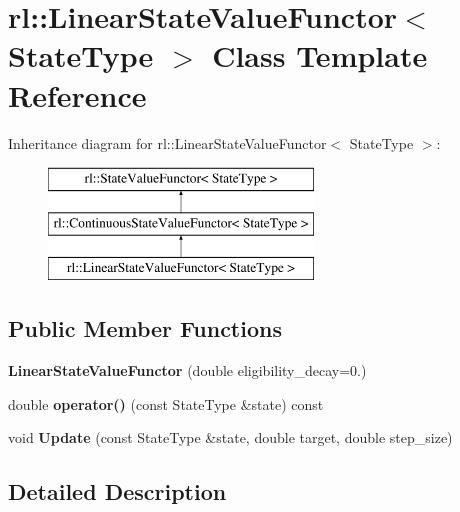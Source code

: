\hypertarget{classrl_1_1_linear_state_value_functor}{}\section{rl\+:\+:Linear\+State\+Value\+Functor$<$ State\+Type $>$ Class Template Reference}
\label{classrl_1_1_linear_state_value_functor}
Inheritance diagram for rl\+:\+:Linear\+State\+Value\+Functor$<$ State\+Type $>$\+:\begin{figure}[H]
\begin{center}
\leavevmode
\includegraphics[height=3.000000cm]{classrl_1_1_linear_state_value_functor}
\end{center}
\end{figure}
\subsection*{Public Member Functions}
\begin{DoxyCompactItemize}
\item 
\hypertarget{classrl_1_1_linear_state_value_functor_a70646abacf43c6d91efa229fa344e43e}{}\label{classrl_1_1_linear_state_value_functor_a70646abacf43c6d91efa229fa344e43e} 
{\bfseries Linear\+State\+Value\+Functor} (double eligibility\+\_\+decay=0.)
\item 
\hypertarget{classrl_1_1_linear_state_value_functor_a4058ae89ce54a0abc8cb9df86322230e}{}\label{classrl_1_1_linear_state_value_functor_a4058ae89ce54a0abc8cb9df86322230e} 
double {\bfseries operator()} (const State\+Type \&state) const
\item 
\hypertarget{classrl_1_1_linear_state_value_functor_a8047e3d478543a2565971d35863271b8}{}\label{classrl_1_1_linear_state_value_functor_a8047e3d478543a2565971d35863271b8} 
void {\bfseries Update} (const State\+Type \&state, double target, double step\+\_\+size)
\end{DoxyCompactItemize}


\subsection{Detailed Description}

